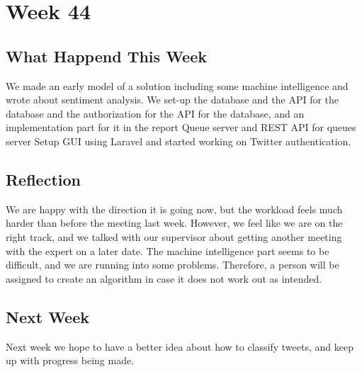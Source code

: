 \section*{Week 44}
\subsection*{What Happend This Week}
We made an early model of a solution including some machine intelligence and
wrote about sentiment analysis. We set-up the database and the \ac{API} for the
database and the authorization for the \ac{API} for the database, and an
implementation part for it in the report Queue server and \ac{REST} \ac{API} for
queues server Setup \ac{GUI} using Laravel and started working on Twitter
authentication.

\subsection*{Reflection}
We are happy with the direction it is going now, but the workload feels much
harder than before the meeting last week. However, we feel like we are on the
right track, and we talked with our supervisor about getting another meeting
with the expert on a later date. The machine intelligence part seems to be
difficult, and we are running into some problems. Therefore, a person will be
assigned to create an algorithm in case it does not work out as intended.

\subsection*{Next Week} 
Next week we hope to have a better idea about how to classify tweets, and
keep up with progress being made.

